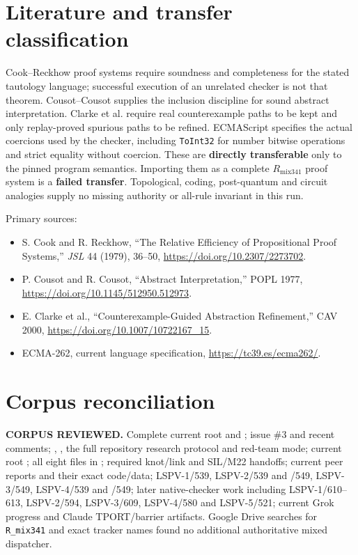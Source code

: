 \documentclass[11pt]{article}
\begin{document}
\section{Literature and transfer classification}

Cook--Reckhow proof systems require soundness and completeness for the stated
tautology language; successful execution of an unrelated checker is not that
theorem.  Cousot--Cousot supplies the inclusion discipline for sound abstract
interpretation.  Clarke et al. require real counterexample paths to be kept and
only replay-proved spurious paths to be refined.  ECMAScript specifies the
actual coercions used by the checker, including \texttt{ToInt32} for number
bitwise operations and strict equality without coercion.  These are
\textbf{directly transferable} only to the pinned program semantics.
Importing them as a complete $R_{\mathrm{mix341}}$ proof system is a
\textbf{failed transfer}.  Topological, coding, post-quantum and circuit
analogies supply no missing authority or all-rule invariant in this run.

Primary sources:
\begin{itemize}
\item S. Cook and R. Reckhow, ``The Relative Efficiency of Propositional
      Proof Systems,'' \emph{JSL} 44 (1979), 36--50,
      \url{https://doi.org/10.2307/2273702}.
\item P. Cousot and R. Cousot, ``Abstract Interpretation,'' POPL 1977,
      \url{https://doi.org/10.1145/512950.512973}.
\item E. Clarke et al., ``Counterexample-Guided Abstraction Refinement,''
      CAV 2000, \url{https://doi.org/10.1007/10722167_15}.
\item ECMA-262, current language specification,
      \url{https://tc39.es/ecma262/}.
\end{itemize}

\section{Corpus reconciliation}

\textbf{CORPUS REVIEWED.}  Complete current root  and
; issue \#3 and recent comments; ,
, the full repository research protocol and red-team mode;
current root ; all eight files in ; required
knot/link and SIL/M22 handoffs; current peer reports and their exact code/data;
LSPV-1/539, LSPV-2/539 and /549, LSPV-3/549, LSPV-4/539 and /549; later
native-checker work including LSPV-1/610--613, LSPV-2/594, LSPV-3/609,
LSPV-4/580 and LSPV-5/521; current Grok progress and Claude TPORT/barrier
artifacts.  Google Drive searches for \texttt{R\_mix341} and exact tracker
names found no additional authoritative mixed dispatcher.
\end{document}
